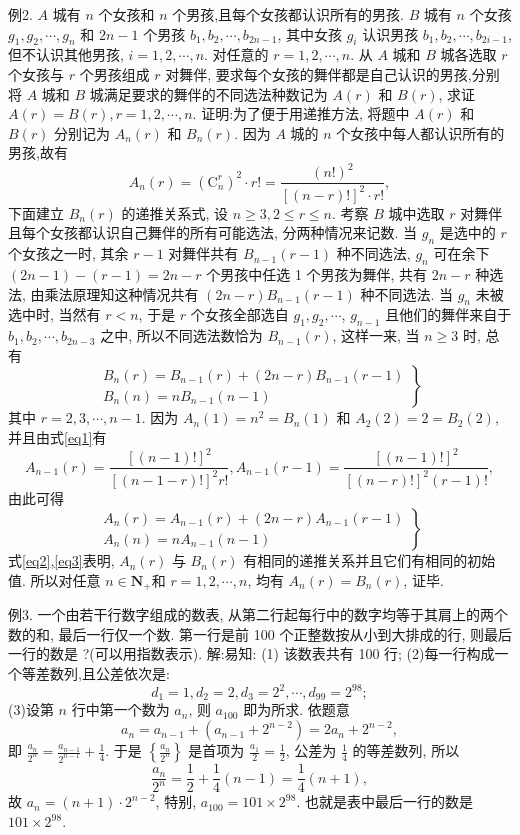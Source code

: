 例2. $A$ 城有 $n$ 个女孩和 $n$ 个男孩,且每个女孩都认识所有的男孩.
$B$ 城有 $n$ 个女孩 $g_1, g_2, \cdots, g_n$ 和 $2 n-1$ 个男孩 $b_1, b_2, \cdots, b_{2 n-1}$, 其中女孩 $g_i$ 认识男孩 $b_1, b_2, \cdots, b_{2 i-1}$, 但不认识其他男孩, $i=1,2, \cdots, n$. 对任意的 $r=1,2, \cdots, n$. 从 $A$ 城和 $B$ 城各选取 $r$ 个女孩与 $r$ 个男孩组成 $r$ 对舞伴, 要求每个女孩的舞伴都是自己认识的男孩,分别将 $A$ 城和 $B$ 城满足要求的舞伴的不同选法种数记为 $A(r)$ 和 $B(r)$, 求证 $A(r)=B(r), r=1,2, \cdots, n$. 
证明:为了便于用递推方法, 将题中 $A(r)$ 和 $B(r)$ 分别记为 $A_n(r)$ 和 $B_n(r)$. 因为 $A$ 城的 $n$ 个女孩中每人都认识所有的男孩,故有
$$
A_n(r)=\left(\mathrm{C}_n^r\right)^2 \cdot r !=\frac{(n !)^2}{[(n-r) !]^2 \cdot r !}, \label{eq1}
$$
下面建立 $B_n(r)$ 的递推关系式, 设 $n \geqslant 3,2 \leqslant r \leqslant n$. 考察 $B$ 城中选取 $r$ 对舞伴且每个女孩都认识自己舞伴的所有可能选法, 分两种情况来记数.
当 $g_n$ 是选中的 $r$ 个女孩之一时, 其余 $r-1$ 对舞伴共有 $B_{n-1}(r-1)$ 种不同选法, $g_n$ 可在余下 $(2 n-1)-(r-1)=2 n-r$ 个男孩中任选 1 个男孩为舞伴, 共有 $2 n-r$ 种选法, 由乘法原理知这种情况共有 $(2 n-r) B_{n-1}(r-1)$ 种不同选法.
当 $g_n$ 未被选中时, 当然有 $r<n$, 于是 $r$ 个女孩全部选自 $g_1, g_2, \cdots$, $g_{n-1}$ 且他们的舞伴来自于 $b_1, b_2, \cdots, b_{2 n-3}$ 之中, 所以不同选法数恰为 $B_{n-1}(r)$, 这样一来, 当 $n \geqslant 3$ 时, 总有
$$
\left.\begin{array}{l}
B_n(r)=B_{n-1}(r)+(2 n-r) B_{n-1}(r-1) \\
B_n(n)=n B_{n-1}(n-1)
\end{array}\right\} \label{eq2}
$$
其中 $r=2,3, \cdots, n-1$.
因为 $A_n(1)=n^2=B_n(1)$ 和 $A_2(2)=2=B_2(2)$, 并且由式\ref{eq1}有
$$
A_{n-1}(r)=\frac{[(n-1) !]^2}{[(n-1-r) !]^2 r !}, A_{n-1}(r-1)=\frac{[(n-1) !]^2}{[(n-r) !]^2(r-1) !},
$$
由此可得
$$
\left.\begin{array}{l}
A_n(r)=A_{n-1}(r)+(2 n-r) A_{n-1}(r-1) \\
A_n(n)=n A_{n-1}(n-1)
\end{array}\right\} \label{eq3}
$$
式\ref{eq2},\ref{eq3}表明, $A_n(r)$ 与 $B_n(r)$ 有相同的递推关系并且它们有相同的初始值.
所以对任意 $n \in \mathbf{N}_{+}$和 $r=1,2, \cdots, n$, 均有 $A_n(r)=B_n(r)$, 证毕.



例3. 一个由若干行数字组成的数表, 从第二行起每行中的数字均等于其肩上的两个数的和, 最后一行仅一个数.
第一行是前 100 个正整数按从小到大排成的行, 则最后一行的数是 ?(可以用指数表示). 
解:易知:
(1) 该数表共有 100 行;
(2)每一行构成一个等差数列,且公差依次是:
$$
d_1=1, d_2=2, d_3=2^2, \cdots, d_{99}=2^{98} ;
$$
(3)设第 $n$ 行中第一个数为 $a_n$, 则 $a_{100}$ 即为所求.
依题意
$$
a_n=a_{n-1}+\left(a_{n-1}+2^{n-2}\right)=2 a_n+2^{n-2},
$$
即 $\frac{a_n}{2^n}=\frac{a_{n-1}}{2^{n-1}}+\frac{1}{4}$. 于是 $\left\{\frac{a_n}{2^n}\right\}$ 是首项为 $\frac{a_1}{2}=\frac{1}{2}$, 公差为 $\frac{1}{4}$ 的等差数列, 所以
$$
\frac{a_n}{2^n}=\frac{1}{2}+\frac{1}{4}(n-1)=\frac{1}{4}(n+1),
$$
故 $a_n=(n+1) \cdot 2^{n-2}$, 特别, $a_{100}=101 \times 2^{98}$. 也就是表中最后一行的数是 $101 \times 2^{98}$.




